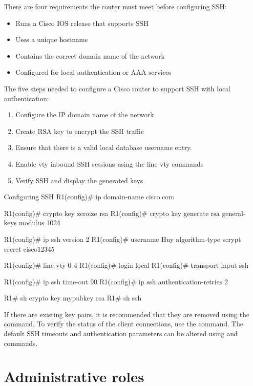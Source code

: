 There are four requirements the router must meet before configuring SSH:

\begin{itemize}
\item Runs a Cisco IOS release that supports SSH
\item Uses a unique hostname
\item Contains the correct domain name of the network
\item Configured for local authentication or AAA services
\end{itemize}

The five steps needed to configure a Cisco router to support SSH with local authentication:

\begin{enumerate}
\item Configure the IP domain name of the network
\item Create RSA key to encrypt the SSH traffic
\item Ensure that there is a valid local database username entry.
\item Enable vty inbound SSH sessions using the line vty commands
\item Verify SSH and display the generated keys
\end{enumerate}

\begin{sexylisting}{Configuring SSH}
R1(config)# ip domain-name cisco.com

R1(config)# crypto key zeroize rsa
R1(config)# crypto key generate rsa general-keys modulus 1024

R1(config)# ip ssh version 2
R1(config)# username Huy algorithm-type scrypt secret cisco12345

R1(config)# line vty 0 4
R1(config)# login local
R1(config)# transport input ssh

R1(config)# ip ssh time-out 90
R1(config)# ip ssh authentication-retries 2

R1# sh crypto key mypubkey rsa
R1# sh ssh
\end{sexylisting}

If there are existing key pairs, it is recommended that they are removed using the  command. To verify the status of the client connections, use the  command. The default SSH timeouts and authentication parameters can be altered using  and  commands.

\section{Administrative roles}

